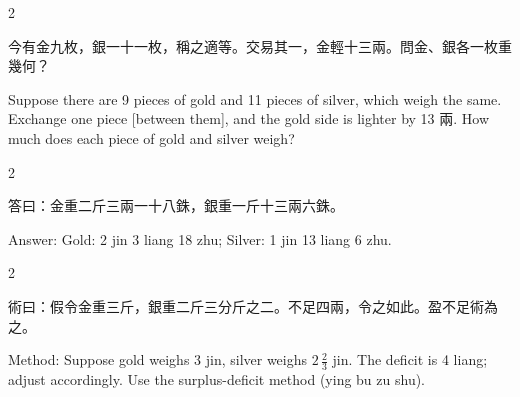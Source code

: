 \documentclass[10pt,a4paper]{article}
\begin{document}
\begin{paracol}{2}

\begin{leftcolumn*}
\begin{problembi}[\textbf{問} · 金銀]
今有金九枚，銀一十一枚，稱之適等。交易其一，金輕十三兩。問金、銀各一枚重幾何？
\end{problembi}
\end{leftcolumn*}

\begin{rightcolumn*}
\begin{problembi}
Suppose there are 9 pieces of gold and 11 pieces of silver, which weigh the same. Exchange one piece [between them], and the gold side is lighter by 13 兩. How much does each piece of gold and silver weigh?
\end{problembi}
\end{rightcolumn*}

\end{paracol}

\begin{paracol}{2}

\begin{leftcolumn*}
\begin{answerbi}[\textbf{答}]
答曰：金重二斤三兩一十八銖，銀重一斤十三兩六銖。
\end{answerbi}
\end{leftcolumn*}

\begin{rightcolumn*}
\begin{answerbi}
Answer: Gold: 2 jin 3 liang 18 zhu; Silver: 1 jin 13 liang 6 zhu.
\end{answerbi}
\end{rightcolumn*}

\end{paracol}

\begin{paracol}{2}

\begin{leftcolumn*}
\begin{methodbi}[\textbf{術}]
術曰：假令金重三斤，銀重二斤三分斤之二。不足四兩，令之如此。盈不足術為之。
\end{methodbi}
\end{leftcolumn*}

\begin{rightcolumn*}
\begin{methodbi}
Method: Suppose gold weighs 3 jin, silver weighs $2\,\frac{2}{3}$ jin. The deficit is 4 liang; adjust accordingly. Use the surplus-deficit method (ying bu zu shu).
\end{methodbi}
\end{rightcolumn*}

\end{paracol}
\end{document}
